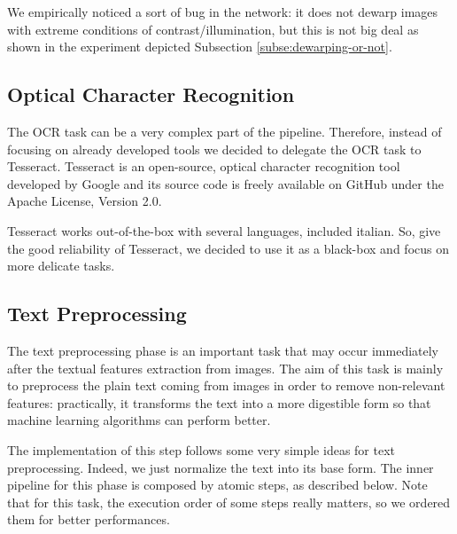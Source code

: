 \documentclass[10pt,twocolumn,letterpaper]{article}
\begin{document}
We empirically noticed a sort of bug in the network: it does not
dewarp images with extreme conditions of contrast/illumination, but
this is not big deal as shown in the experiment depicted Subsection
\ref{subse:dewarping-or-not}.

\subsection{Optical Character Recognition}

The OCR task can be a very complex part of the pipeline. Therefore,
instead of focusing on already developed tools we decided to delegate
the OCR task to Tesseract. Tesseract is an open-source, optical
character recognition tool developed by Google and its source code is
freely available on GitHub under the Apache License, Version 2.0.

Tesseract works out-of-the-box with several languages, included
italian. So, give the good reliability of Tesseract, we decided to use
it as a black-box and focus on more delicate tasks.

\subsection{Text Preprocessing}

The text preprocessing phase is an important task that may occur
immediately after the textual features extraction from images. The aim
of this task is mainly to preprocess the plain text coming from images
in order to remove non-relevant features: practically, it transforms
the text into a more digestible form so that machine learning
algorithms can perform better.

The implementation of this step follows some very simple ideas for
text preprocessing. Indeed, we just normalize the text into its base
form. The inner pipeline for this phase is composed by atomic steps,
as described below. Note that for this task, the execution order of
some steps really matters, so we ordered them for better performances.
\end{document}
